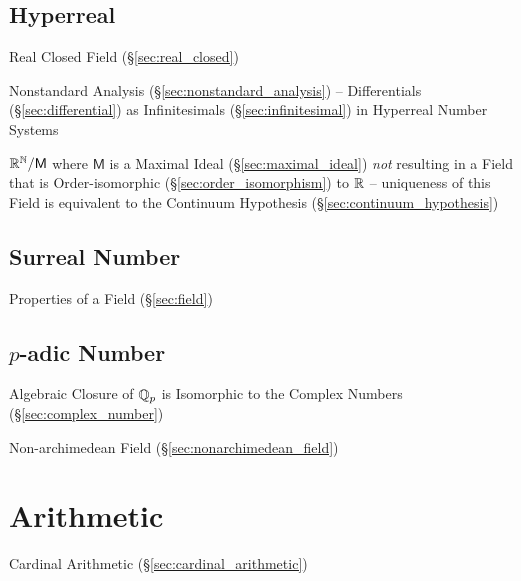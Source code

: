 \subsection{Hyperreal}\label{sec:hyperreal}

Real Closed Field (\S\ref{sec:real_closed})

\fist Nonstandard Analysis (\S\ref{sec:nonstandard_analysis}) -- Differentials
  (\S\ref{sec:differential}) as Infinitesimals (\S\ref{sec:infinitesimal}) in
  Hyperreal Number Systems

$\mathbb{R}^{\mathbb{N}} / \mathsf{M}$ where $\mathsf{M}$ is a Maximal Ideal
(\S\ref{sec:maximal_ideal}) \emph{not} resulting in a Field that is
Order-isomorphic (\S\ref{sec:order_isomorphism}) to $\mathbb{R}$ --
uniqueness of this Field is equivalent to the Continuum Hypothesis
(\S\ref{sec:continuum_hypothesis})



\subsection{Surreal Number}\label{sec:surreal_number}

Properties of a Field (\S\ref{sec:field})



\subsection{$p$-adic Number}\label{sec:padic_number}

Algebraic Closure of $\mathbb{Q}_p$ is Isomorphic to the Complex Numbers
(\S\ref{sec:complex_number})

Non-archimedean Field (\S\ref{sec:nonarchimedean_field})



\section{Arithmetic}\label{sec:arithmetic}

Cardinal Arithmetic (\S\ref{sec:cardinal_arithmetic})

